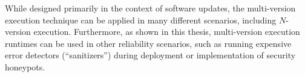 While designed primarily in the context of software updates, the multi-version
execution technique can be applied in many different scenarios, including
$N$-version execution. Furthermore, as shown in this thesis, multi-version
execution runtimes can be used in other reliability scenarios, such as running
expensive error detectors (``sanitizers'') during deployment or implementation
of security honeypots.




